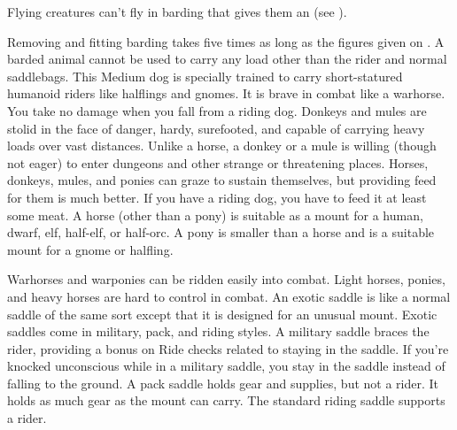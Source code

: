         \par Flying creatures can't fly in barding that gives them an  (see ).
        \par Removing and fitting barding takes five times as long as the figures given on . A barded animal cannot be used to carry any load other than the rider and normal saddlebags.
         This Medium dog is specially trained to carry short-statured humanoid riders like halflings and gnomes. It is brave in combat like a warhorse. You take no damage when you fall from a riding dog.
         Donkeys and mules are stolid in the face of danger, hardy, surefooted, and capable of carrying heavy loads over vast distances. Unlike a horse, a donkey or a mule is willing (though not eager) to enter dungeons and other strange or threatening places.
         Horses, donkeys, mules, and ponies can graze to sustain themselves, but providing feed for them is much better. If you have a riding dog, you have to feed it at least some meat.
         A horse (other than a pony) is suitable as a mount for a human, dwarf, elf, half-elf, or half-orc. A pony is smaller than a horse and is a suitable mount for a gnome or halfling.
        \par Warhorses and warponies can be ridden easily into combat. Light horses, ponies, and heavy horses are hard to control in combat.
         An exotic saddle is like a normal saddle of the same sort except that it is designed for an unusual mount. Exotic saddles come in military, pack, and riding styles.
         A military saddle braces the rider, providing a  bonus on Ride checks related to staying in the saddle. If you're knocked unconscious while in a military saddle, you stay in the saddle instead of falling to the ground.
         A pack saddle holds gear and supplies, but not a rider. It holds as much gear as the mount can carry.
         The standard riding saddle supports a rider.

